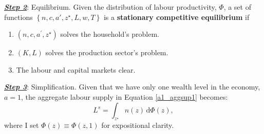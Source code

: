 \colorbox{Gray!25}{\textbf{\textit{\underline{Step 2}}}: Equilibrium.}
Given the distribution of labour productivity, $\Phi$, a set of functions $\left\{n,c,a',z^\star,L,w,T \right\}$ is a \textcolor{BurntOrange}{\textbf{stationary competitive equilibrium}} if
\begin{enumerate}
    \item $\left(n,c,a^\prime, z^\star \right)$ solves the household's problem.
    \item $(K,L)$ solves the production sector's problem. 
    \item The labour and capital markets clear. 
\end{enumerate}  

\colorbox{Gray!25}{\textbf{\textit{\underline{Step 3}}}: Simplification.}
Given that we have only one wealth level in the economy, $a=1$, the aggregate labour supply in Equation \eqref{a1_aggsup1} becomes:
\begin{equation}
    L^s = \int_{z^\star} n(z) \,  \mathrm{d}\Phi(z),
\end{equation}
where I set $\Phi(z)\equiv \Phi(z,1)$ for expositional clarity. 
\newpage

